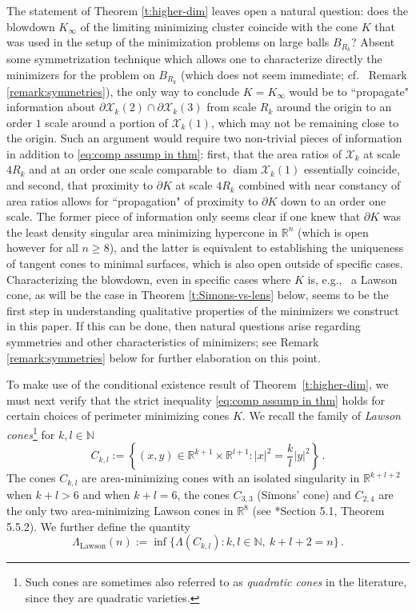 \documentclass[10pt,reqno]{amsart}
\numberwithin{equation}{section}
\theoremstyle{definition}
\DeclareMathOperator{\diam}{diam}
\newcommand{\N}{\mathbb{N}}
\newcommand{\R}{\mathbb{R}}
\DeclareMathOperator{\Lawson}{Lawson}
\newcommand{\X}{\mathcal{X}}
\begin{document}
The statement of Theorem \ref{t:higher-dim} leaves open a natural question: does the blowdown $K_\infty$ of the limiting minimizing cluster coincide with the cone $K$ that was used in the setup of the minimization problems on large balls $B_{R_k}$? Absent some symmetrization technique which allows one to characterize directly the minimizers for the problem on $B_{R_k}$ (which does not seem immediate; cf.~ Remark \ref{remark:symmetries}), the only way to conclude $K=K_\infty$ would be to ``propagate" information about $\partial \X_k(2) \cap \partial \X_k(3)$ from scale $R_k$ around the origin to an order $1$ scale around a portion of $\X_k(1)$, which may not be remaining close to the origin. Such an argument would require two non-trivial pieces of information in addition to \eqref{eq:comp assump in thm}: first, that the area ratios of $\X_k$ at scale $4R_k$ and at an order one scale comparable to $\diam \X_k(1)$ essentially coincide, and second, that proximity to $\partial K$ at scale $4R_k$ combined with near constancy of area ratios allows for ``propagation" of proximity to $\partial K$ down to an order one scale. The former piece of information only seems clear if one knew that $\partial K$ was the least density singular area minimizing hypercone in $\mathbb{R}^n$ (which is open however for all $n\geq 8$), and the latter is equivalent to establishing the uniqueness of tangent cones to minimal surfaces, which is also open outside of specific cases. {Characterizing the blowdown, even in specific cases where $K$ is, e.g.,~ a Lawson cone, as will be the case in Theorem \ref{t:Simons-vs-lens} below, seems to be the first step in understanding qualitative properties of the minimizers we construct in this paper. If this can be done, then natural questions arise regarding symmetries and other characteristics of minimizers; see Remark \ref{remark:symmetries} below for further elaboration on this point.}
\medskip


To make use of the conditional existence result of Theorem~\ref{t:higher-dim}, we must next verify that the strict inequality \eqref{eq:comp assump in thm} holds for certain choices of perimeter minimizing cones $K$.
We recall the family of \emph{Lawson cones}\footnote{Such cones are sometimes also referred to as \emph{quadratic cones} in the literature, since they are quadratic varieties.} {for $k,l\in\N$}
\[
    C_{k,l}:= \left\{(x,y) \in \R^{k+1}\times\R^{l+1} : |x|^2 = \frac{k}{l} |y|^2\right\}\,.
\]
The cones $C_{k,l}$ are area-minimizing cones with an isolated singularity in $\R^{k+l+2}$ when $k+l > 6$ and when $k+l=6$, the cones $C_{3,3}$ (Simons' cone) and $C_{2,4}$ are the only two area-minimizing Lawson cones in $\R^8$ (see \cite{Lawlor91}*{Section 5.1, Theorem 5.5.2}). We further define the quantity
\begin{equation}
    \label{eqn: Lambda Lawson def}
    \Lambda_{\Lawson}(n) := \inf\{\Lambda(C_{k,l}) : k,l\in \N, \ k+l+2=n\}\,.
\end{equation}
\end{document}

